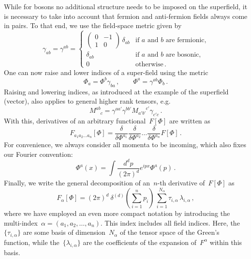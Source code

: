 \documentclass[10pt,prd,nofootinbib,superscriptaddress,twocolumn]{revtex4-2}
\begin{document}
While for bosons no additional structure needs to be imposed on the superfield, it is necessary to take into account that fermion and anti-fermion fields always come in pairs.
To that end, we use the field-space metric given by
%
\begin{equation}
	\gamma_{ab} = \gamma^{ab} = \begin{cases}
		\begin{pmatrix}
			0 & -1 \\
			1 & 0
		\end{pmatrix}\,\delta_{ab}
		& \text{if $a$ and $b$ are fermionic,} \\[3ex]
		\delta_{ab} & \text{if $a$ and $b$ are bosonic,}   \\[2ex]
		0               & \text{otherwise} 
		\,.
	\end{cases}
\end{equation}
%
One can now raise and lower indices of a super-field using the metric
%
\begin{equation}
	\Phi_a = \Phi^b\gamma_{ba} \,,
	\quad \quad
	\Phi^a = \gamma^{ab}\Phi_b \,.
\end{equation}
%
Raising and lowering indices, as introduced at the example of the superfield (vector), also applies to general higher rank tensors, e.g.
%
\begin{equation}
	M^{ab}_{\phantom{ab}c} = \gamma^{aa'} \gamma^{bb'} M_{a'b'}^{\phantom{a'b'}c'} \gamma_{c'c}
	\,.
\end{equation}
%
With this, derivatives of an arbitrary functional~$F[\Phi]$ are written as
%
\begin{equation}
	F_{a_1 a_2 \ldots a_n}[\Phi] =
	\frac{\delta}{\delta \Phi^{a_1}} \frac{\delta}{\delta \Phi^{a_2}} \ldots \frac{\delta}{\delta \Phi^{a_n}} F[\Phi]
	\,.
	\label{eq:Falpha}
\end{equation}
%
For convenience, we always consider all momenta to be incoming, which also fixes our Fourier convention:
%
\begin{equation}
	\Phi^a(x) = \int \frac{d^d p}{(2\pi)^d} e^{ipx}\Phi^a(p)
	\,.
\end{equation}
%	
Finally, we write the general decomposition of an~$n$-th derivative of~$F[\Phi]$ as
%
\begin{equation}\label{eq:general_decomposition}
	F_{\alpha}[\Phi] = (2\pi)^d\ \delta^{(d)}\left( \sum_{i=1}^n p_i \right)\,
	\sum_{i=1}^{N_\alpha} \tau_{i,\alpha} \, \lambda_{i,\alpha}
	\,,
\end{equation}
%
where we have employed an even more compact notation by introducing the multi-index~$\alpha = (a_1, a_2, \ldots, a_n)$. 
This index includes all field indices.
Here, the~$\{\tau_{i,\alpha}\}$ are some basis of dimension~$N_\alpha$ of the tensor space of the Green's function, while the~$\{\lambda_{i,\alpha}\}$ are the coefficients of the expansion of~$F^\alpha$ within this basis.
\end{document}
